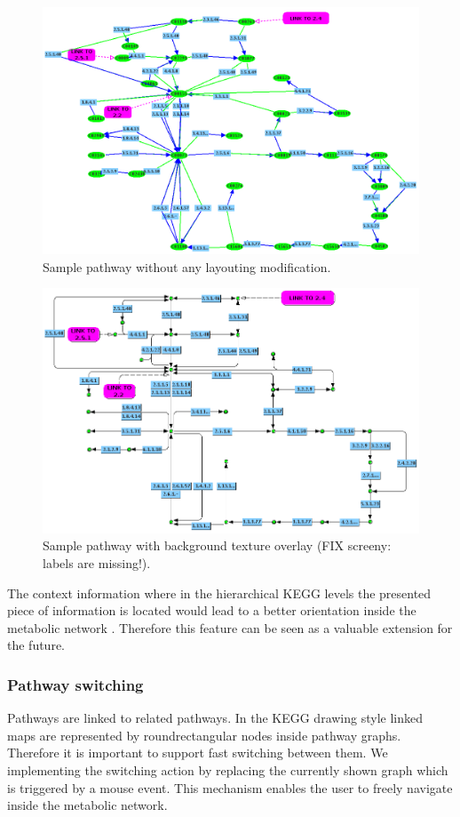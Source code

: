 \begin{figure}[ht]
  \centering
    \includegraphics[width=0.7\linewidth]{gfx/sample_pathway_jgraph}
  \caption{Sample pathway without any layouting modification.}
  \label{fig:sample_pathway_jgraph}
\end{figure}

\begin{figure}[ht]
  \centering
    \includegraphics[width=0.7\linewidth]{gfx/sample_pathway_jgraph_background}
  \caption{Sample pathway with background texture overlay (FIX screeny: labels are missing!).}
  \label{fig:sample_pathway_jgraph_background}
\end{figure}

The context information where in the hierarchical KEGG levels the presented piece of information is located would lead to a better orientation inside the metabolic network \cite{Jourdan2003}. Therefore this feature can be seen as a valuable extension for the future. 

\subsubsection{Pathway switching}
\label{ssec:pathway_switching}

Pathways are linked to related pathways. In the KEGG drawing style linked maps are represented by roundrectangular nodes inside pathway graphs. Therefore it is important to support fast switching between them. We implementing the switching action by replacing the currently shown graph which is triggered by a mouse event. This mechanism enables the user to freely navigate inside the metabolic network.

